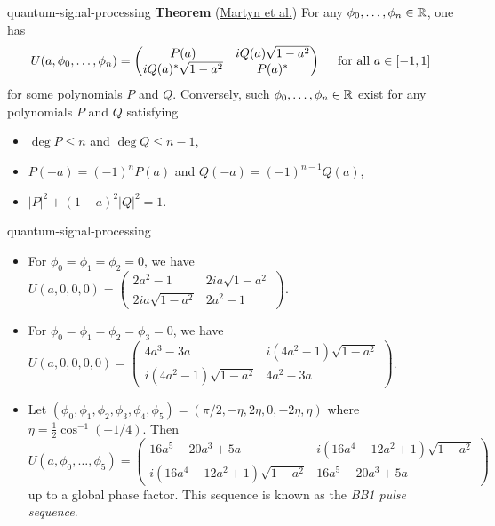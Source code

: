 \begin{example}{quantum-signal-processing}
    \textbf{Theorem} (\href{https://arxiv.org/pdf/2105.02859}{Martyn et al.})
    For any $\phi_0, \ldots, \phi_n \in \mathbb{R}$, one has
    \[ U(a, \phi_0, \ldots, \phi_n) = \begin{pmatrix}
        P(a) & i Q(a) \sqrt{1 - a^2} \\
        i Q(a)^* \sqrt{1 - a^2} & P(a)^*
    \end{pmatrix} \quad \textup{ for all } a \in [-1, 1] \]
    for some polynomials $P$ and $Q$. Conversely, such $\phi_0, \ldots, \phi_n \in \mathbb{R}$ exist for any polynomials $P$ and $Q$ satisfying
    \begin{itemize}
        \item $\deg P \le n$ and $\deg Q \le n - 1$,
        \item $P(-a) = (-1)^n P(a)$ and $Q(-a) = (-1)^{n - 1} Q(a)$,
        \item $|P|^2 + (1 - a)^2 |Q|^2 = 1$.
    \end{itemize}
\end{example}

\begin{example}{quantum-signal-processing}
    \begin{itemize}
        \item For $\phi_0 = \phi_1 = \phi_2 = 0$, we have $U(a, 0, 0, 0) = \begin{pmatrix}
            2 a^2 - 1 & 2 i a \sqrt{1 - a^2} \\
            2 i a \sqrt{1 - a^2} & 2 a^2 - 1
        \end{pmatrix}$.
        \item For $\phi_0 = \phi_1 = \phi_2 = \phi_3 = 0$, we have $U(a, 0, 0, 0, 0) = \begin{pmatrix}
            4 a^3 - 3 a & i (4 a^2 - 1) \sqrt{1 - a^2} \\
            i (4 a^2 - 1) \sqrt{1 - a^2} & 4 a^2 - 3 a
        \end{pmatrix}$.
        \item Let $(\phi_0, \phi_1, \phi_2, \phi_3, \phi_4, \phi_5) = (\pi/2, -\eta, 2 \eta, 0, -2 \eta, \eta)$ where $\eta = \tfrac{1}{2} \cos^{-1}(-1/4)$. Then
        \[ U(a, \phi_0, \ldots, \phi_5) = \begin{pmatrix}
            16 a^5 - 20 a^3 + 5 a & i (16 a^4 - 12 a^2 + 1) \sqrt{1 - a^2} \\
            i (16 a^4 - 12 a^2 + 1) \sqrt{1 - a^2} & 16 a^5 - 20 a^3 + 5 a
        \end{pmatrix} \]
        up to a global phase factor. This sequence is known as the \textit{BB1 pulse sequence}.
    \end{itemize}
\end{example}

